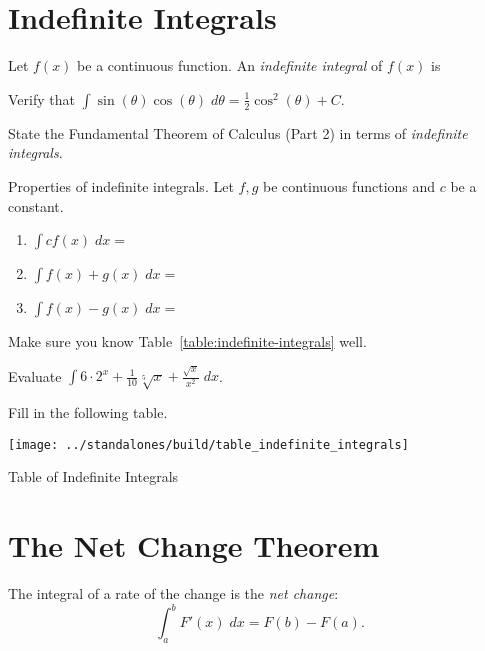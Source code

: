\documentclass[../main.tex]{subfiles}
\begin{document}

\section{Indefinite Integrals}

Let \(f(x)\) be a {continuous} function. An \emph{indefinite integral} of \(f(x)\) is 
\vspace{3in}

\begin{example}
  Verify that \(\int \sin(\theta) \cos(\theta) \; d\theta = \frac{1}{2} \cos^{2}(\theta) + C\).
\end{example}
\vspace{2in}
\bigskip

\faComments{} State the Fundamental Theorem of Calculus (Part 2) in terms of \emph{indefinite integrals}. 
\vspace{2in}

\clearpage

\begin{mdframed}[style=simple]
  Properties of indefinite integrals. Let \(f,g\) be continuous functions and \(c\) be a constant.
  \begin{enumerate}[label=(\alph*)]
    \item  \(\int c f(x) \;dx = \)
    \item  \(\int f(x) + g(x) \;dx = \)
    \item  \(\int f(x) - g(x) \;dx = \)
  \end{enumerate}
\end{mdframed}
\faStar{} Make sure you know Table~\ref{table:indefinite-integrals} well.

\begin{example}
  Evaluate \(\int 6 \cdot 2^{x} + \frac{1}{10} \sqrt[5]{x} + \frac{\sqrt{x}}{x^{2}} \; dx\).
\end{example}

\clearpage

Fill in the following table.

\begin{table}[h!]  %
\centering
\texttt{[image: ../standalones/build/table\_indefinite\_integrals]}
\caption{Table of Indefinite Integrals}
\label{table:indefinite-integrals}
\end{table}

\clearpage

\section{The Net Change Theorem}
\begin{mdframed}[style=withref]
  The integral of a rate of the change is the \emph{net change}:
  \[
    \int_{a}^{b} F'(x) \; dx = F(b) - F(a).
  \]

\end{mdframed}
\vspace{1in}
\end{document}
